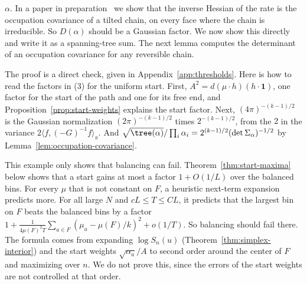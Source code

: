 
$\alpha$. In a paper in preparation~\cite{paperC} we show that the inverse
Hessian of the rate is the occupation covariance of a tilted chain, on every
face where the chain is irreducible. So $D(\alpha)$ should be a Gaussian
factor. We now show this directly and write it
as a spanning-tree sum. The next lemma computes the determinant of an occupation
covariance for any reversible chain.

The proof is a direct check, given in Appendix~\ref{app:thresholds}. Here is how
to read the factors in (3) for the uniform start. First,
$A^2=d(\mu\cdot h)(h\cdot\mathbf1)$, one factor for the start of the path and one
for its free end, and Proposition~\ref{prop:start-weights} explains the start factor.
Next, $(4\pi)^{-(k-1)/2}$ is the Gaussian normalization $(2\pi)^{-(k-1)/2}$ times
$2^{-(k-1)/2}$, from the $2$ in the variance $2\langle f,(-G)^{-1}f\rangle_\pi$.
And $\sqrt{\tree(\alpha)}/\prod_i\alpha_i=2^{(k-1)/2}(\det\Sigma_\alpha)^{-1/2}$ by
Lemma~\ref{lem:occupation-covariance}.

This example only shows that balancing can fail.
Theorem~\ref{thm:start-maxima} below shows that a start gains at most a factor
$1+O(1/L)$ over the balanced bins. For every $\mu$ that is not constant on $F$, a
heuristic next-term expansion predicts more. For all large $N$ and
$cL\le T\le CL$, it predicts that the largest bin on $F$ beats the balanced bins
by a factor
$1+\frac1{4\mu(F)^2T}\sum_{a\in F}(\mu_a-\mu(F)/k)^2+o(1/T)$. So balancing
should fail there. The formula comes from expanding $\log S_n(u)$
(Theorem~\ref{thm:simplex-interior}) and the start weights $\sqrt{\alpha_a}/A$
to second order around the center of $F$ and maximizing over $n$. We do not
prove this, since the errors of the start weights are not controlled at that
order.

